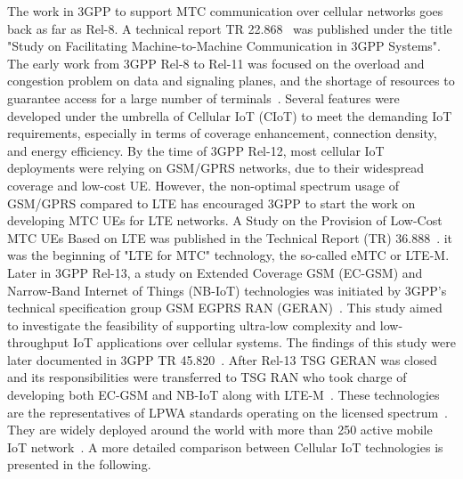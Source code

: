 \documentclass[]{IEEEtran}
\begin{document}
The work in 3GPP to support MTC communication over cellular networks goes back as far as Rel-8.
A technical report TR 22.868~\cite{TR_22.868} was published under the title "Study on Facilitating Machine-to-Machine Communication in 3GPP Systems".
The early work from 3GPP Rel-8 to Rel-11 was focused on the overload and congestion problem on data and signaling planes, and the shortage of resources to guarantee access for a large number of terminals~\cite{benhiba_comparative_2018}.
Several features were developed under the umbrella of Cellular IoT (CIoT) to meet the demanding IoT requirements, especially in terms of coverage enhancement, connection density, and energy efficiency.
By the time of 3GPP Rel-12, most cellular IoT deployments were relying on GSM/GPRS networks, due to their widespread coverage and low-cost UE.
However, the non-optimal spectrum usage of GSM/GPRS compared to LTE has encouraged 3GPP to start the work on developing MTC UEs for LTE networks.
A Study on the Provision of Low-Cost MTC UEs Based on LTE was published in the Technical Report (TR) 36.888~\cite{TR_36.888}.
it was the beginning of "LTE for MTC" technology, the so-called eMTC or LTE-M.
Later in 3GPP Rel-13, a study on Extended Coverage GSM (EC-GSM) and Narrow-Band Internet of Things (NB-IoT) technologies was initiated by 3GPP's technical specification group GSM EGPRS RAN (GERAN)~\cite{liberg_cellular_2019}.
This study aimed to investigate the feasibility of supporting ultra-low complexity and low-throughput IoT applications over cellular systems.
The findings of this study were later documented in 3GPP TR 45.820~\cite{TR_45.820}.
After Rel-13 TSG GERAN was closed and its responsibilities were transferred to TSG RAN who took charge of developing both EC-GSM and NB-IoT along with LTE-M~\cite{liberg_cellular_2019}.
These technologies are the representatives of LPWA standards operating on the licensed spectrum~\cite{adelantado2017understanding}.
They are widely deployed around the world with more than 250 active mobile IoT network~\cite{noauthor_mobile_nodate}.
A more detailed comparison between Cellular IoT technologies is presented in the following.
\end{document}
